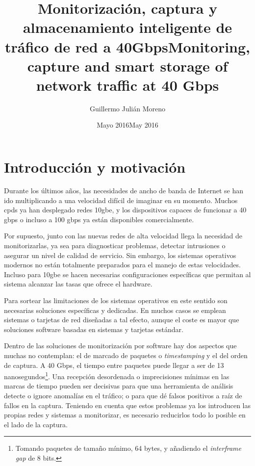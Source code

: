 \documentclass[oneside, draft]{epstfg}
\title[spa]{Monitorización, captura y almacenamiento inteligente de tráfico de red a 40Gbps}
\title[eng]{Monitoring, capture and smart storage of network traffic at 40 Gbps}
\author{Guillermo Julián Moreno}
\date[spa]{Mayo 2016}
\date[eng]{May 2016}
\begin{document}

\frontmatter

\maketitle[spa]
\maketitle[eng]

\makeinnertitle[spa]
\makeinnertitle[eng]

\makeabstract[spa]
\makeabstract[eng]

\tableofcontents
\clearsidepage
\listoftables
\clearsidepage
\listoffigures
\clearsidepage

\mainmatter

\chapter{Introducción y motivación}

Durante los últimos años, las necesidades de ancho de banda de Internet se han ido multiplicando a una velocidad difícil de imaginar en su momento. Muchos \glspl{cpd} ya han desplegado redes \gls{10gbe}, y los dispositivos capaces de funcionar a 40 \gls{gbps} o incluso a 100 \gls{gbps} ya están disponibles comercialmente.

Por supuesto, junto con las nuevas redes de alta velocidad llega la necesidad de monitorizarlas, ya sea para diagnosticar problemas, detectar intrusiones o asegurar un nivel de calidad de servicio. Sin embargo, los sistemas operativos modernos no están totalmente preparados para el manejo de estas velocidades. Incluso para \gls{10gbe} se hacen necesarias configuraciones específicas \cite{leitao2009tuning} que permitan al sistema alcanzar las tasas que ofrece el hardware.

Para sortear las limitaciones de los sistemas operativos en este sentido son necesarias soluciones específicas y dedicadas. En muchos casos se emplean sistemas o tarjetas de red diseñadas a tal efecto, aunque el coste es mayor que soluciones software basadas en sistemas y tarjetas estándar.

Dentro de las soluciones de monitorización por software hay dos aspectos que muchas  no contemplan: el de marcado de paquetes o \textit{timestamping} y el del orden de captura. A 40 Gbps, el tiempo entre paquetes puede llegar a ser de 13 nanosegundos\footnote{Tomando paquetes de tamaño mínimo, 64 bytes, y añadiendo el \textit{interframe gap} de 8 bits.}. Una recepción desordenada o imprecisiones mínimas en las marcas de tiempo pueden ser decisivas para que una herramienta de análisis detecte o ignore anomalías en el tráfico; o para que dé falsos positivos a raíz de fallos en la captura. Teniendo en cuenta que estos problemas ya los introducen las propias redes y sistemas a monitorizar, es necesario reducirlos todo lo posible en el lado de la captura.
\end{document}
